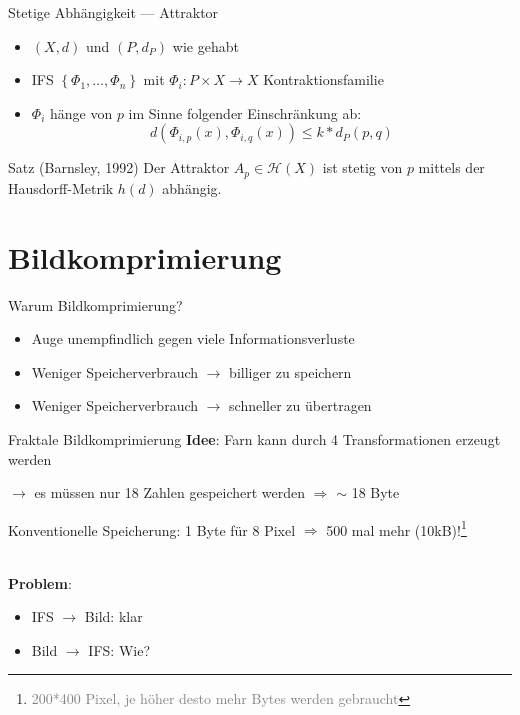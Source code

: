 \documentclass[10pt]{beamer}
\begin{document}
\begin{frame}{Stetige Abhängigkeit --- Attraktor}
  \begin{itemize}
    \item \( (X,d) \) und \( (P, d_P) \) wie gehabt
    \item IFS \( \left \{ \Phi_1, \dots, \Phi_n \right \} \) mit \( \Phi_i: P \times X \to X \) Kontraktionsfamilie
    \item \( \Phi_i \) hänge von \( p \) im Sinne folgender Einschränkung ab:
    \begin{equation*}
      d(\Phi_{i,p}(x), \Phi_{i,q}(x)) \leq k * d_P(p,q)
    \end{equation*}
  \end{itemize}
  \begin{block}{Satz (Barnsley, 1992)}
    Der Attraktor \( A_p \in \mathcal{H}(X) \) ist stetig von \( p \) mittels der Hausdorff-Metrik \( h(d) \) abhängig.
  \end{block}
\end{frame}

\section{Bildkomprimierung}

\begin{frame}{Warum Bildkomprimierung?}
  \begin{itemize}
    \item Auge unempfindlich gegen viele Informationsverluste
    \item Weniger Speicherverbrauch \( \to \) billiger zu speichern
    \item Weniger Speicherverbrauch \( \to \) schneller zu übertragen
  \end{itemize}
\end{frame}

\begin{frame}{Fraktale Bildkomprimierung}
  \textbf{Idee}: Farn kann durch 4 Transformationen erzeugt werden

  \( \to \) es müssen nur 18 Zahlen gespeichert werden \( \Rightarrow \) \alert{\( \sim \) 18 Byte}

  Konventionelle Speicherung: 1 Byte für 8 Pixel \( \Rightarrow \) \alert{500 mal mehr} (10kB)!\footnote{\scriptsize{\textcolor{gray}{200*400 Pixel, je höher desto mehr Bytes werden gebraucht}}}
  
  \  \\

  \pause{}
  \textbf{Problem}:
  \begin{itemize}
    \item IFS \( \to \) Bild: klar
    \item Bild \( \to \) IFS: Wie?
  \end{itemize}
\end{frame}
\end{document}
